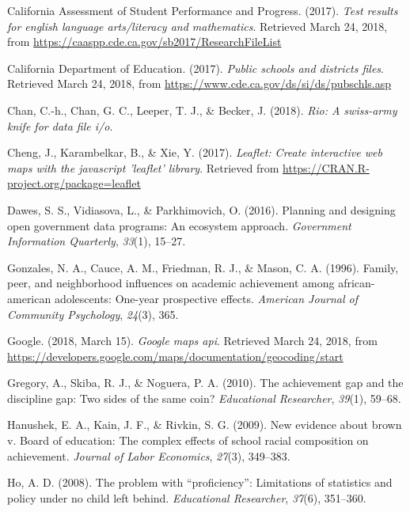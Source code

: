 \documentclass[man, fleqn, noextraspace]{apa6}
\theoremstyle{definition}
\theoremstyle{definition}
\theoremstyle{definition}
\theoremstyle{remark}
\begin{document}
\leavevmode\hypertarget{ref-ca17a}{}%
California Assessment of Student Performance and Progress. (2017).
\emph{Test results for english language arts/literacy and mathematics}.
Retrieved March 24, 2018, from
\url{https://caaspp.cde.ca.gov/sb2017/ResearchFileList}

\leavevmode\hypertarget{ref-ca17b}{}%
California Department of Education. (2017). \emph{Public schools and
districts files}. Retrieved March 24, 2018, from
\url{https://www.cde.ca.gov/ds/si/ds/pubschls.asp}

\leavevmode\hypertarget{ref-rio}{}%
Chan, C.-h., Chan, G. C., Leeper, T. J., \& Becker, J. (2018).
\emph{Rio: A swiss-army knife for data file i/o}.

\leavevmode\hypertarget{ref-leaflet}{}%
Cheng, J., Karambelkar, B., \& Xie, Y. (2017). \emph{Leaflet: Create
interactive web maps with the javascript 'leaflet' library}. Retrieved
from \url{https://CRAN.R-project.org/package=leaflet}

\leavevmode\hypertarget{ref-dawes16}{}%
Dawes, S. S., Vidiasova, L., \& Parkhimovich, O. (2016). Planning and
designing open government data programs: An ecosystem approach.
\emph{Government Information Quarterly}, \emph{33}(1), 15--27.

\leavevmode\hypertarget{ref-gonzales96}{}%
Gonzales, N. A., Cauce, A. M., Friedman, R. J., \& Mason, C. A. (1996).
Family, peer, and neighborhood influences on academic achievement among
african-american adolescents: One-year prospective effects.
\emph{American Journal of Community Psychology}, \emph{24}(3), 365.

\leavevmode\hypertarget{ref-google}{}%
Google. (2018, March 15). \emph{Google maps api}. Retrieved March 24,
2018, from
\url{https://developers.google.com/maps/documentation/geocoding/start}

\leavevmode\hypertarget{ref-gregory10}{}%
Gregory, A., Skiba, R. J., \& Noguera, P. A. (2010). The achievement gap
and the discipline gap: Two sides of the same coin? \emph{Educational
Researcher}, \emph{39}(1), 59--68.

\leavevmode\hypertarget{ref-hanushek09}{}%
Hanushek, E. A., Kain, J. F., \& Rivkin, S. G. (2009). New evidence
about brown v. Board of education: The complex effects of school racial
composition on achievement. \emph{Journal of Labor Economics},
\emph{27}(3), 349--383.

\leavevmode\hypertarget{ref-ho08}{}%
Ho, A. D. (2008). The problem with ``proficiency'': Limitations of
statistics and policy under no child left behind. \emph{Educational
Researcher}, \emph{37}(6), 351--360.
\end{document}
